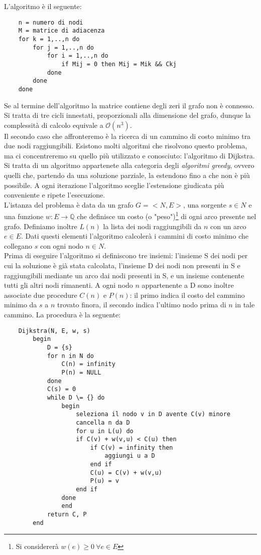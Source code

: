 \newpage
L'algoritmo è il seguente:
\begin{verbatim}
    n = numero di nodi
    M = matrice di adiacenza
    for k = 1,..,n do
        for j = 1,..,n do
            for i = 1,..,n do
                if Mij = 0 then Mij = Mik && Ckj
            done
        done
    done
\end{verbatim}
Se al termine dell'algoritmo la matrice contiene degli zeri il grafo non è connesso.\\
Si tratta di tre cicli innestati, proporzionali alla dimensione del grafo, dunque la complessità di calcolo equivale a $\mathcal{O}(n^3)$.\\
Il secondo caso che affronteremo è la ricerca di un cammino di costo minimo tra due nodi raggiungibili. Esistono molti algoritmi che risolvono questo problema, ma ci concentreremo su quello più utilizzato e conosciuto: l'algoritmo di Dijkstra. Si tratta di un algoritmo appartenete alla categoria degli \textit{algoritmi greedy}, ovvero quelli che, partendo da una soluzione parziale, la estendono fino a che non è più possibile. A ogni iterazione l'algoritmo sceglie l'estensione giudicata più conveniente e ripete l'esecuzione.\\
L'istanza del problema è data da un grafo $G = <N,E>$, una sorgente $s \in N$ e una funzione $w: E \rightarrow \mathbb{Q}$ che definisce un costo (o "peso")\footnote{Si considererà $w(e) \geq 0 \ \forall e \in E$} di ogni arco presente nel grafo. Definiamo inoltre $L(n)$ la lista dei nodi raggiungibili da $n$ con un arco $e \in E$. Dati questi elementi l'algoritmo calcolerà i cammini di costo minimo che collegano $s$ con ogni nodo $n \in N$.\\
Prima di eseguire l'algoritmo si definiscono tre insiemi: l'insieme S dei nodi per cui la soluzione è già stata calcolata, l'insieme D dei nodi non presenti in S e raggiungibili mediante un arco dai nodi presenti in S, e un insieme contenente tutti gli altri nodi rimanenti. A ogni nodo $n$ appartenente a D sono inoltre associate due procedure $C(n)$ e $P(n)$: il primo indica il costo del cammino minimo da $s$ a $n$ trovato finora, il secondo indica l'ultimo nodo prima di $n$ in tale cammino.
\newpage
La procedura è la seguente:
\begin{verbatim}
    Dijkstra(N, E, w, s)
        begin
            D = {s}
            for n in N do
                C(n) = infinity
                P(n) = NULL
            done
            C(s) = 0
            while D \= {} do
                begin
                    seleziona il nodo v in D avente C(v) minore
                    cancella n da D
                    for u in L(u) do
                    if C(v) + w(v,u) < C(u) then
                        if C(v) = infinity then
                            aggiungi u a D
                        end if
                        C(u) = C(v) + w(v,u)
                        P(u) = v
                    end if
                done
                end
            return C, P
        end
\end{verbatim}
